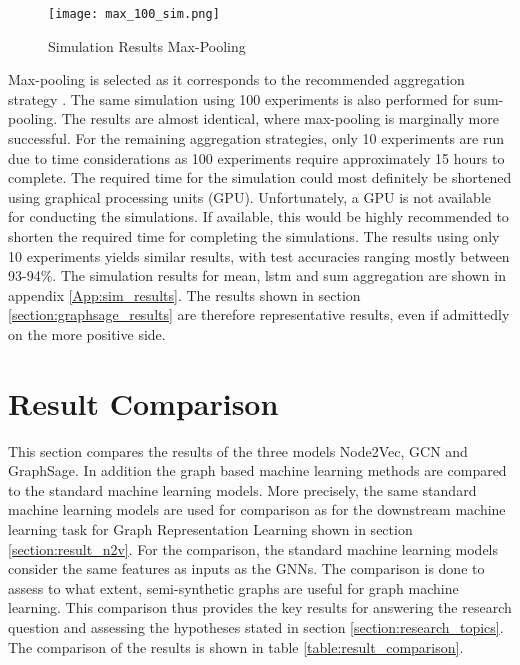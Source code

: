   \begin{figure}[htbp!]
		\centering
		\texttt{[image: max\_100\_sim.png]}
		\caption{Simulation Results Max-Pooling}
        \label{fig:simulation_results}
  \end{figure}

  \noindent Max-pooling is selected as it corresponds to the recommended
  aggregation strategy \citep[p. 9]{hamilton2017inductive}. The same simulation
  using 100 experiments is also performed for sum-pooling. The results are
  almost identical, where max-pooling is marginally more successful. For the 
  remaining aggregation strategies, only 10 experiments are run due to time
  considerations as 100 experiments require approximately 15 hours to complete.
  The required time for the simulation could most definitely be shortened using
  graphical processing units (GPU). Unfortunately, a GPU is not available for
  conducting the simulations. If available, this would be highly recommended to
  shorten the required time for completing the simulations. The results using 
  only 10 experiments yields similar results, with test accuracies ranging 
  mostly between 93-94\%. The simulation results for mean, lstm and sum 
  aggregation are shown in appendix \ref{App:sim_results}. The results shown in 
  section \ref{section:graphsage_results} are therefore representative results, 
  even if admittedly on the more positive side. 

  \newpage
  \section{Result Comparison}
  \label{section:result_comp}

  This section compares the results of the three models Node2Vec, GCN and
  GraphSage. In addition the graph based machine learning methods are compared
  to the standard machine learning models. More precisely, the same standard
  machine learning models are used for comparison as for the downstream 
  machine learning task for Graph Representation Learning shown in section 
  \ref{section:result_n2v}. For the comparison, the standard machine learning 
  models consider the same features as inputs as the GNNs. The comparison is 
  done to assess to what extent, semi-synthetic graphs are useful for graph 
  machine learning. This comparison thus provides the key results for answering
  the research question and assessing the hypotheses stated in section 
  \ref{section:research_topics}. The comparison of the results is shown in table 
  \ref{table:result_comparison}.

